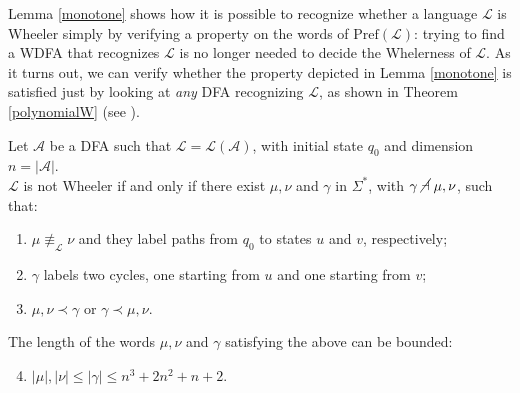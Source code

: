 \documentclass[runningheads]{llncs}
\newcommand{\pf}[1]{\text{Pref}(\mathcal #1)}
\newcommand{\ndashv}{\;\cancel\dashv\;}
\newcommand{\la}[1]{\mathcal L(\mathcal #1)}
\begin{document}
Lemma \ref{monotone} shows how it is possible to recognize whether a language $\mathcal L$ is Wheeler simply by verifying a property on the words of $\pf L$: trying to find a WDFA that recognizes $\mathcal L$ is no longer needed to decide the Whelerness of $\mathcal L$. 
As it turns out, we can verify whether the property depicted in Lemma \ref{monotone} is satisfied just by looking at \emph{any} DFA recognizing $\mathcal L$, as shown in Theorem \ref{polynomialW} (see \cite{ADPP2}).

\begin{theorem}
\label{polynomialW}
Let $\mathcal A$ be a DFA such that $\mathcal L = \la A$,  with initial state $q_0$ and dimension $n = |\mathcal A|$. 
\\$\mathcal L$ is not Wheeler if and only if there exist $\mu, \nu$ and $\gamma$ in $\Sigma^*$, with $\gamma \ndashv \mu,\nu$, such that:
\begin{enumerate}
    \item $\mu \not\equiv_\mathcal L \nu$ and they label paths from $q_0$ to states $u$ and $v$, respectively;
    \item $\gamma$ labels two cycles, one starting from $u$ and one starting from $v$;
    \item $\mu, \nu \prec \gamma$\; or \; $\gamma \prec \mu,\nu$.
\end{enumerate}
The length of the words $\mu, \nu$ and $\gamma$ satisfying the above  can be bounded: 
\begin{enumerate}
\setcounter{enumi}{3}
    \item $|\mu|, |\nu| \le |\gamma| \le n^3+2n^2+n+2$.
\end{enumerate}
\end{theorem}
\end{document}
